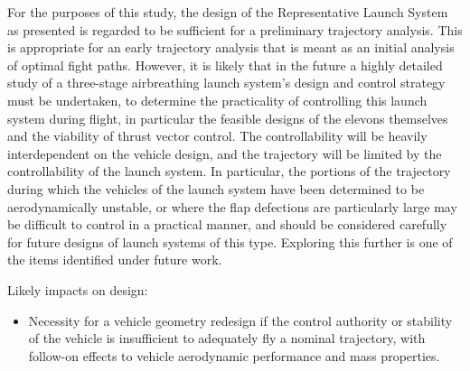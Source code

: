 For the purposes of this study, the design of the Representative Launch System as presented is regarded to be sufficient for a preliminary trajectory analysis. This is appropriate for an early trajectory analysis that is meant as an initial analysis of optimal fight paths. 
However, it is likely that in the future a highly detailed study of a three-stage airbreathing launch system's design and control strategy must be undertaken, to determine the practicality of controlling this launch system during flight, in particular the feasible designs of the elevons themselves and the viability of thrust vector control. The controllability will be heavily interdependent on the vehicle design, and the trajectory will be limited by the controllability of the launch system. In particular, the portions of the trajectory during which the vehicles of the launch system have been determined to be aerodynamically unstable, or where the flap defections are particularly large may be difficult to control in a practical manner, and should be considered carefully for future designs of launch systems of this type. 
Exploring this further is one of the items identified under future work.

Likely impacts on design:
\begin{itemize}[noitemsep,topsep=0pt]
	\item Necessity for a vehicle geometry redesign if the control authority or stability of the vehicle is insufficient to adequately fly a nominal trajectory, with follow-on effects to vehicle aerodynamic performance and mass properties.
\end{itemize}
	


